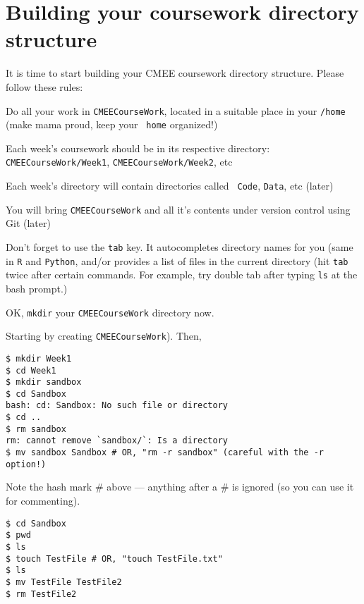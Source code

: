 \section{Building your coursework directory structure}

It is time to start building your CMEE coursework directory structure. 
Please follow these rules:
	\begin{compactitem}

		\item Do all your work in {\tt CMEECourseWork}, located in a 
		suitable place in your {\tt /home} (make mama proud, keep your {\tt 
		home} organized!)
	 \item Each week's coursework should be in its respective directory: 
	 {\tt CMEECourseWork/Week1}, {\tt CMEECourseWork/Week2}, etc
	 \item Each week's directory will contain directories called {\tt 
	 Code}, {\tt Data}, etc (later)
		\item You will bring {\tt CMEECourseWork} and all it's contents 
			 under version control using Git (later)
  \end{compactitem}

\begin{tipbox}
Don't forget to use the {\tt tab} key. It autocompletes directory 
names for you (same in {\tt R} and {\tt Python}, and/or provides  
a list of files in the current directory (hit {\tt tab} twice after 
certain commands. For example, try double tab after typing {\tt ls} 
at the bash prompt.)  	
\end{tipbox}

\begin{compactitem}[$\quad\star$]\itemsep4pt
	\item OK, {\tt mkdir} your {\tt CMEECourseWork} directory now.
\end{compactitem}
Starting by creating {\tt CMEECourseWork}). Then,

\begin{lstlisting}
$ mkdir Week1
$ cd Week1
$ mkdir sandbox
$ cd Sandbox
bash: cd: Sandbox: No such file or directory
$ cd ..
$ rm sandbox
rm: cannot remove `sandbox/`: Is a directory
$ mv sandbox Sandbox # OR, "rm -r sandbox" (careful with the -r option!)
\end{lstlisting}

Note the hash mark \# above --- anything after a \# is ignored (so you 
can use it for commenting).

\begin{lstlisting}
$ cd Sandbox
$ pwd
$ ls
$ touch TestFile # OR, "touch TestFile.txt"
$ ls
$ mv TestFile TestFile2
$ rm TestFile2
\end{lstlisting}

